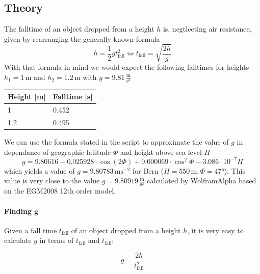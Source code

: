 \documentclass{scrreprt}
\newcommand{\unit}[1]{\ensuremath{\, \mathrm{#1}}}
\begin{document}
\subsection{Theory}
The falltime of an object dropped from a height $h$ is, negtlecting air resistance, given by rearranging the generally known formula 
\begin{equation}h = \frac{1}{2} g t_{\text{fall}}^{2} \Longleftrightarrow  t_{\text{fall}} = \sqrt{\frac{2h}{g}}
\end{equation}
With that formula in mind we would expect the following falltimes for heights $h_1 = 1\unit{m}$ and $h_2 = 1.2\unit{m}$ with $g = 9.81\unit{\frac{m}{s^{2}}}$

\begin{center}
    \begin{tabular}{|l||l|}
    \hline
    Height [m] & Falltime [s]\\ \hline \hline
    1 & 0.452\\ \hline
    1.2 & 0.495\\ \hline
    \end{tabular}
\end{center}

We can use the formula stated in the script \cite[p. 54, f. 4.2]{physcript13} to approximate the value of $g$ in dependance of geographic latitude $\Phi$ and height above sea level $H$
\begin{equation} 
g = 9.80616 - 0.025928 \cdot \cos(2\Phi) + 0 .000069 \cdot \cos^{2} \Phi - 3.086 \cdot 10^{-7} H
\end{equation}
which yields a value of $g = 9.80783\unit{ms^{-2}}$ for Bern ($H = 550\unit{m}, \Phi = \ang{47}$). This value is very close to the value $g = 9.80919\unit{\frac{m}{s^{2}}}$ calculated by WolframAlpha based on the EGM2008 12th order model.\\

\paragraph*{Finding $\mathbf{g}$}
Given a fall time $t_{\text{fall}}$ of an object dropped from a height $h$, it is very easy to calculate $g$ in terms of $t_{\text{fall}}$ and $t_{\text{fall}}$:

\begin{equation} \label{eq:find}
g=\frac{2h}{t_{\text{fall}}^2}
\end{equation}
\end{document}
